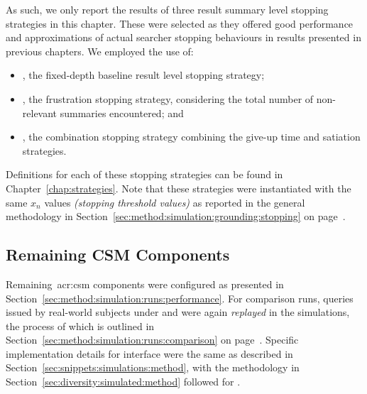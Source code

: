 As such, we only report the results of three result summary level stopping strategies in this chapter. These were selected as they offered good performance and approximations of actual searcher stopping behaviours in results presented in previous chapters. We employed the use of:

\begin{itemize}
    \item{, the fixed-depth baseline result level stopping strategy;}
    \item{, the frustration stopping strategy, considering the total number of non-relevant summaries encountered; and}
    \item{, the combination stopping strategy combining the give-up time and satiation strategies.}
\end{itemize}

Definitions for each of these stopping strategies can be found in Chapter~\ref{chap:strategies}. Note that these strategies were instantiated with the same $x_n$ values \emph{(stopping threshold values)} as reported in the general methodology in Section~\ref{sec:method:simulation:grounding:stopping} on page~\pageref{sec:method:simulation:grounding:stopping}.

\subsection{Remaining CSM Components}\label{sec:serp:method:other}
Remaining~\gls{acr:csm} components were configured as presented in Section~\ref{sec:method:simulation:runs:performance}. For comparison runs, queries issued by real-world subjects under  and  were again \emph{replayed} in the simulations, the process of which is outlined in Section~\ref{sec:method:simulation:runs:comparison} on page~\pageref{sec:method:simulation:runs:comparison}. Specific implementation details for interface  were the same as described in Section~\ref{sec:snippets:simulations:method}, with the methodology in Section~\ref{sec:diversity:simulated:method} followed for .

%


